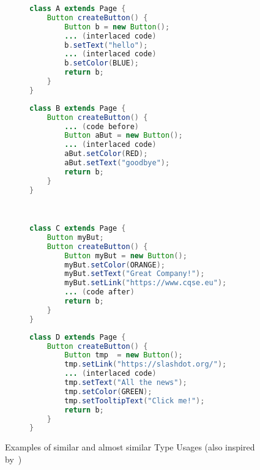 \begin{figure}[h]
    \centering
    \begin{subfigure}[c]{0.47\textwidth}
        \begin{lstlisting}[language=java, frame=single, basicstyle=\footnotesize]
class A extends Page {
    Button createButton() {
        Button b = new Button();
        ... (interlaced code)
        b.setText("hello");
        ... (interlaced code)
        b.setColor(BLUE);
        return b;
    }
}
        \end{lstlisting}
    \end{subfigure}
    \quad
    \begin{subfigure}[c]{0.47\textwidth}
        \begin{lstlisting}[language=java, frame=single, basicstyle=\footnotesize]
class B extends Page {
    Button createButton() {
        ... (code before)
        Button aBut = new Button();
        ... (interlaced code)
        aBut.setColor(RED);
        aBut.setText("goodbye");
        return b;
    }
}
        \end{lstlisting}
    \end{subfigure}
    \\

    \begin{subfigure}[c]{0.47\textwidth}
        \begin{lstlisting}[language=java, frame=single, basicstyle=\footnotesize, showstringspaces=false]
class C extends Page {
    Button myBut;
    Button createButton() {
        Button myBut = new Button();
        myBut.setColor(ORANGE);
        myBut.setText("Great Company!");
        myBut.setLink("https://www.cqse.eu");
        ... (code after)
        return b;
    }
}
        \end{lstlisting}
    \end{subfigure}
    \quad
    \begin{subfigure}[c]{0.47\textwidth}
        \begin{lstlisting}[language=java, frame=single, basicstyle=\footnotesize, showstringspaces=false]
class D extends Page {
    Button createButton() {
        Button tmp  = new Button();
        tmp.setLink("https://slashdot.org/");
        ... (interlaced code)
        tmp.setText("All the news");
        tmp.setColor(GREEN);
        tmp.setTooltipText("Click me!");
        return b;
    }
}
        \end{lstlisting}
    \end{subfigure}

    \caption{Examples of similar and almost similar Type Usages (also inspired by~\cite{monperrus2013detecting})}\label{fig:sim_asim}
\end{figure}

